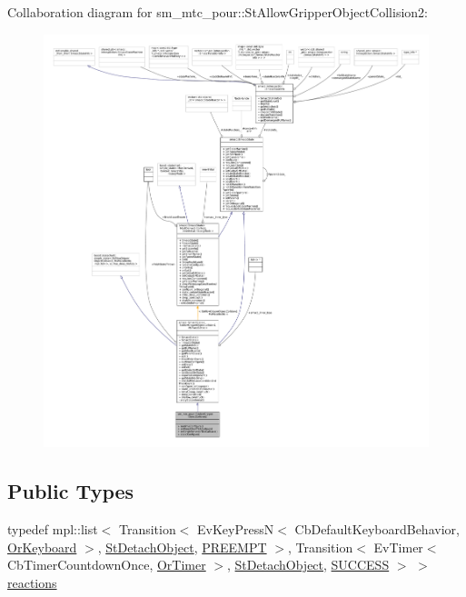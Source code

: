 Collaboration diagram for sm\+\_\+mtc\+\_\+pour\+:\+:St\+Allow\+Gripper\+Object\+Collision2\+:
\nopagebreak
\begin{figure}[H]
\begin{center}
\leavevmode
\includegraphics[width=350pt]{structsm__mtc__pour_1_1StAllowGripperObjectCollision2__coll__graph}
\end{center}
\end{figure}
\subsection*{Public Types}
\begin{DoxyCompactItemize}
\item 
typedef mpl\+::list$<$ Transition$<$ Ev\+Key\+PressN$<$ Cb\+Default\+Keyboard\+Behavior, \hyperlink{classsm__mtc__pour_1_1OrKeyboard}{Or\+Keyboard} $>$, \hyperlink{structsm__mtc__pour_1_1StDetachObject}{St\+Detach\+Object}, \hyperlink{classPREEMPT}{P\+R\+E\+E\+M\+PT} $>$, Transition$<$ Ev\+Timer$<$ Cb\+Timer\+Countdown\+Once, \hyperlink{classsm__mtc__pour_1_1OrTimer}{Or\+Timer} $>$, \hyperlink{structsm__mtc__pour_1_1StDetachObject}{St\+Detach\+Object}, \hyperlink{classSUCCESS}{S\+U\+C\+C\+E\+SS} $>$ $>$ \hyperlink{structsm__mtc__pour_1_1StAllowGripperObjectCollision2_a0a52bd33a5e01c27f088a0cb71f816cd}{reactions}
\end{DoxyCompactItemize}
